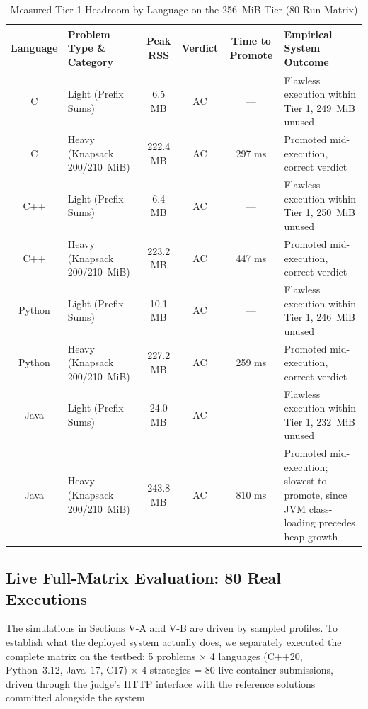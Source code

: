 \documentclass[conference]{IEEEtran}
\begin{document}
\begin{table}[!t]
\caption{Measured Tier-1 Headroom by Language on the 256~MiB Tier (80-Run Matrix)}
\label{tab:128mb_boundary}
\centering
\small
\begin{tabularx}{\textwidth}{|c|Y|c|c|c|Y|}
\hline
\textbf{Language} &
\textbf{Problem Type \& Category} &
\textbf{Peak RSS} &
\textbf{Verdict} &
\textbf{Time to Promote} &
\textbf{Empirical System Outcome} \\
\hline
C &
Light (Prefix Sums) &
6.5 MB &
AC &
--- &
Flawless execution within Tier 1, 249~MiB unused \\
\hline
C &
Heavy (Knapsack 200/210~MiB) &
222.4 MB &
AC &
297 ms &
Promoted mid-execution, correct verdict \\
\hline
C++ &
Light (Prefix Sums) &
6.4 MB &
AC &
--- &
Flawless execution within Tier 1, 250~MiB unused \\
\hline
C++ &
Heavy (Knapsack 200/210~MiB) &
223.2 MB &
AC &
447 ms &
Promoted mid-execution, correct verdict \\
\hline
Python &
Light (Prefix Sums) &
10.1 MB &
AC &
--- &
Flawless execution within Tier 1, 246~MiB unused \\
\hline
Python &
Heavy (Knapsack 200/210~MiB) &
227.2 MB &
AC &
259 ms &
Promoted mid-execution, correct verdict \\
\hline
Java &
Light (Prefix Sums) &
24.0 MB &
AC &
--- &
Flawless execution within Tier 1, 232~MiB unused \\
\hline
Java &
Heavy (Knapsack 200/210~MiB) &
243.8 MB &
AC &
810 ms &
Promoted mid-execution; slowest to promote, since JVM class-loading precedes heap growth \\
\hline
\end{tabularx}
\end{table}



\subsection{Live Full-Matrix Evaluation: 80 Real Executions}
The simulations in Sections V-A and V-B are driven by sampled profiles. To establish what the deployed system actually does, we separately executed the complete matrix on the testbed: 5 problems $\times$ 4 languages (C++20, Python~3.12, Java~17, C17) $\times$ 4 strategies = 80 live container submissions, driven through the judge's HTTP interface with the reference solutions committed alongside the system.
\end{document}
